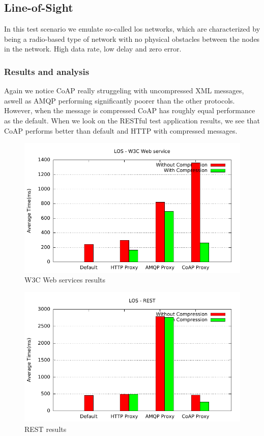 \subsection{Line-of-Sight}

In this test scenario we emulate so-called \gls{los} networks, which are
characterized by being a radio-based type of network with no physical obstacles
between the nodes in the network. High data rate, low delay and zero error.

\subsubsection{Results and analysis} 

Again we notice CoAP really struggeling with uncompressed XML messages, aswell
as AMQP performing significantly poorer than the other protocols. However,
when the message is compressed CoAP has roughly equal performance as the
default. When we look on the RESTful test application results, we see that
CoAP performs better than default and HTTP with compressed messages.

\begin{figure}[H]
\center
\includegraphics[scale=0.75]{../results/los/nffi/out.pdf}
\caption{W3C Web services results}
\end{figure}

\begin{figure}[H]
\center
\includegraphics[scale=0.75]{../results/los/rest/out.pdf}
\caption{REST results}
\end{figure}



